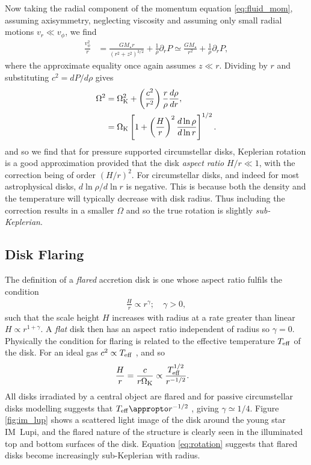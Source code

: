 Now taking the radial component of the momentum equation \ref{eq:fluid_mom}, assuming axisymmetry, neglecting viscosity and assuming only small radial motions $v_r \ll v_\phi$, we find
\begin{align}
    \frac{v_\phi^2}{r} &= \frac{G M_\star r}{\left( r^2 + z^2  \right)^{3/2}} + \frac{1}{\rho} \partial_r P \simeq \frac{G M_\star}{ r^2} + \frac{1}{\rho} \partial_r P, \label{eq:rot_eq_full}
\end{align}
where the approximate equality once again assumes $z \ll r$.
Dividing by $r$ and substituting $c^2=dP/d\rho$ gives
\begin{align}
    \Omega^2 &= \Omega_{\rm K}^2 + \left( \frac{c^2}{r^2} \right) \frac{r}{\rho} \frac{d \rho}{dr}, \\
    &= \Omega_{\rm K} \left[ 1 + \left(\frac{H}{r}\right)^2 \frac{d \ln{\rho}}{d \ln{r}} \right]^{1/2} . \label{eq:rotation}
\end{align}
and so we find that for pressure supported circumstellar disks, Keplerian rotation is a good approximation provided that the disk \textit{aspect ratio} $H/r \ll 1$, with the correction being of order $(H/r)^2$.
For circumstellar disks, and indeed for most astrophysical disks, $d\ln{\rho}/d\ln{r}$ is negative.
This is because both the density and the temperature will typically decrease with disk radius.
Thus including the correction results in a smaller $\Omega$ and so the true rotation is slightly \textit{sub-Keplerian}.

\subsection{Disk Flaring} \label{sec:disk_flaring}

The definition of a \textit{flared} accretion disk is one whose aspect ratio fulfils the condition
\begin{align}
    \frac{H}{r} \propto r^\gamma; \quad \gamma > 0, \label{eq:flared_hr}
\end{align}
such that the scale height $H$ increases with radius at a rate greater than linear $H \propto r^{1+\gamma}$. 
A \textit{flat} disk then has an aspect ratio independent of radius so 
$\gamma=0$.
Physically the condition for flaring is related to the effective temperature $T_{\rm eff}$ of the disk.
For an ideal gas $c^2 \propto T_{\rm eff}$ \citep[eg.][]{pringle2007}, and so
\begin{align}
    \frac{H}{r} &= \frac{c}{r \Omega_{\rm K}} \propto \frac{T_{\rm eff}^{1/2}}{r^{-1/2}}.
\end{align}
All disks irradiated by a central object are flared \citep{kenyon1987} and for passive circumstellar disks modelling suggests that $T_{\rm eff} \appropto r^{-1/2}$ \citep{chiang1997}, giving $\gamma \simeq 1/4$.
Figure \ref{fig:im_lup} shows a scattered light image of the disk around the young star IM~Lupi, and the flared nature of the structure is clearly seen in the illuminated top and bottom surfaces of the disk.
Equation \ref{eq:rotation} suggests that flared disks become increasingly sub-Keplerian with radius.

